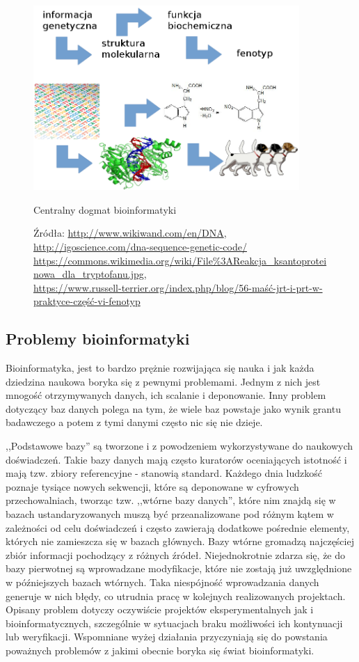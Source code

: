 \begin{figure}[h]
	\centering
	\includegraphics[width=0.9\textwidth]{img/centralny-dogmat.png}
	\caption{Centralny dogmat bioinformatyki}
	\vspace{-0.5cm}
	\caption*{\scriptsize Źródła: 
		\url{http://www.wikiwand.com/en/DNA},
		\url{http://igoscience.com/dna-sequence-genetic-code/} \\
		\url{https://commons.wikimedia.org/wiki/File\%3AReakcja\_ksantoproteinowa\_dla\_tryptofanu.jpg}, \\
		\url{https://www.russell-terrier.org/index.php/blog/56-maść-jrt-i-prt-w-praktyce-część-vi-fenotyp}
	}
	\label{img:centralny-dogmat}
\end{figure}

\subsection*{Problemy bioinformatyki}
Bioinformatyka, jest to bardzo prężnie rozwijająca się nauka i jak każda dziedzina naukowa boryka się z pewnymi problemami.
Jednym z nich jest mnogość otrzymywanych danych, ich scalanie i deponowanie.
Inny problem dotyczący baz danych polega na tym, że wiele baz powstaje jako wynik grantu badawczego a potem z tymi danymi często nic się nie dzieje.

,,Podstawowe bazy'' są tworzone i z powodzeniem wykorzystywane do naukowych doświadczeń.
Takie bazy danych mają często kuratorów oceniających istotność i mają tzw. zbiory referencyjne - stanowią standard.
Każdego dnia ludzkość poznaje tysiące nowych sekwencji, które są deponowane w cyfrowych przechowalniach, tworząc tzw. ,,wtórne bazy danych'', które nim znajdą się w bazach ustandaryzowanych muszą być przeanalizowane pod różnym kątem w zależności od celu doświadczeń i często zawierają dodatkowe pośrednie elementy, których nie zamieszcza się w bazach głównych.
Bazy wtórne gromadzą najczęściej zbiór informacji pochodzący z różnych źródeł.
Niejednokrotnie zdarza się, że do bazy pierwotnej są wprowadzane modyfikacje, które nie zostają już uwzględnione w późniejszych bazach wtórnych. 
Taka niespójność wprowadzania danych generuje w nich błędy, co utrudnia pracę w kolejnych realizowanych projektach.
Opisany problem dotyczy oczywiście projektów eksperymentalnych jak i bioinformatycznych, szczególnie w sytuacjach braku możliwości ich kontynuacji lub weryfikacji.
Wspomniane wyżej działania przyczyniają się do powstania poważnych problemów z jakimi obecnie boryka się świat bioinformatyki.

